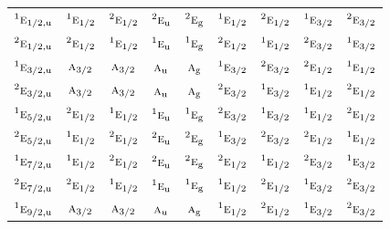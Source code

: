 \documentclass[10pt,a4paper]{article}
\numberwithin{equation}{section}
\newcommand{\irr}[1]{\text{\normalfont\scshape #1}}
\newcommand{\conjpair}[1]{{}^{#1}}
\newcommand{\ptag}[1]{\mathrm{#1}}
\begin{document}
{\begin{longtable}{@{}lcccccccc@{}}
$\conjpair{1}\irr{e}_{1/2,\ptag{u}}$ & $\conjpair{1}\irr{e}_{1/2}$ & $\conjpair{2}\irr{e}_{1/2}$ & $\conjpair{2}\irr{e}_{\ptag{u}}$ & $\conjpair{2}\irr{e}_{\ptag{g}}$ & $\conjpair{1}\irr{e}_{1/2}$ & $\conjpair{2}\irr{e}_{1/2}$ & $\conjpair{1}\irr{e}_{3/2}$ & $\conjpair{2}\irr{e}_{3/2}$\\
$\conjpair{2}\irr{e}_{1/2,\ptag{u}}$ & $\conjpair{2}\irr{e}_{1/2}$ & $\conjpair{1}\irr{e}_{1/2}$ & $\conjpair{1}\irr{e}_{\ptag{u}}$ & $\conjpair{1}\irr{e}_{\ptag{g}}$ & $\conjpair{2}\irr{e}_{1/2}$ & $\conjpair{1}\irr{e}_{1/2}$ & $\conjpair{2}\irr{e}_{3/2}$ & $\conjpair{1}\irr{e}_{3/2}$\\
$\conjpair{1}\irr{e}_{3/2,\ptag{u}}$ & $\irr{a}_{3/2}$ & $\irr{a}_{3/2}$ & $\irr{a}_{\ptag{u}}$ & $\irr{a}_{\ptag{g}}$ & $\conjpair{1}\irr{e}_{3/2}$ & $\conjpair{2}\irr{e}_{3/2}$ & $\conjpair{2}\irr{e}_{1/2}$ & $\conjpair{1}\irr{e}_{1/2}$\\
$\conjpair{2}\irr{e}_{3/2,\ptag{u}}$ & $\irr{a}_{3/2}$ & $\irr{a}_{3/2}$ & $\irr{a}_{\ptag{u}}$ & $\irr{a}_{\ptag{g}}$ & $\conjpair{2}\irr{e}_{3/2}$ & $\conjpair{1}\irr{e}_{3/2}$ & $\conjpair{1}\irr{e}_{1/2}$ & $\conjpair{2}\irr{e}_{1/2}$\\
$\conjpair{1}\irr{e}_{5/2,\ptag{u}}$ & $\conjpair{2}\irr{e}_{1/2}$ & $\conjpair{1}\irr{e}_{1/2}$ & $\conjpair{1}\irr{e}_{\ptag{u}}$ & $\conjpair{1}\irr{e}_{\ptag{g}}$ & $\conjpair{2}\irr{e}_{3/2}$ & $\conjpair{1}\irr{e}_{3/2}$ & $\conjpair{1}\irr{e}_{1/2}$ & $\conjpair{2}\irr{e}_{1/2}$\\
$\conjpair{2}\irr{e}_{5/2,\ptag{u}}$ & $\conjpair{1}\irr{e}_{1/2}$ & $\conjpair{2}\irr{e}_{1/2}$ & $\conjpair{2}\irr{e}_{\ptag{u}}$ & $\conjpair{2}\irr{e}_{\ptag{g}}$ & $\conjpair{1}\irr{e}_{3/2}$ & $\conjpair{2}\irr{e}_{3/2}$ & $\conjpair{2}\irr{e}_{1/2}$ & $\conjpair{1}\irr{e}_{1/2}$\\
$\conjpair{1}\irr{e}_{7/2,\ptag{u}}$ & $\conjpair{1}\irr{e}_{1/2}$ & $\conjpair{2}\irr{e}_{1/2}$ & $\conjpair{2}\irr{e}_{\ptag{u}}$ & $\conjpair{2}\irr{e}_{\ptag{g}}$ & $\conjpair{2}\irr{e}_{1/2}$ & $\conjpair{1}\irr{e}_{1/2}$ & $\conjpair{2}\irr{e}_{3/2}$ & $\conjpair{1}\irr{e}_{3/2}$\\
$\conjpair{2}\irr{e}_{7/2,\ptag{u}}$ & $\conjpair{2}\irr{e}_{1/2}$ & $\conjpair{1}\irr{e}_{1/2}$ & $\conjpair{1}\irr{e}_{\ptag{u}}$ & $\conjpair{1}\irr{e}_{\ptag{g}}$ & $\conjpair{1}\irr{e}_{1/2}$ & $\conjpair{2}\irr{e}_{1/2}$ & $\conjpair{1}\irr{e}_{3/2}$ & $\conjpair{2}\irr{e}_{3/2}$\\
$\conjpair{1}\irr{e}_{9/2,\ptag{u}}$ & $\irr{a}_{3/2}$ & $\irr{a}_{3/2}$ & $\irr{a}_{\ptag{u}}$ & $\irr{a}_{\ptag{g}}$ & $\conjpair{1}\irr{e}_{1/2}$ & $\conjpair{2}\irr{e}_{1/2}$ & $\conjpair{1}\irr{e}_{3/2}$ & $\conjpair{2}\irr{e}_{3/2}$\\

\end{longtable}}
\end{document}
